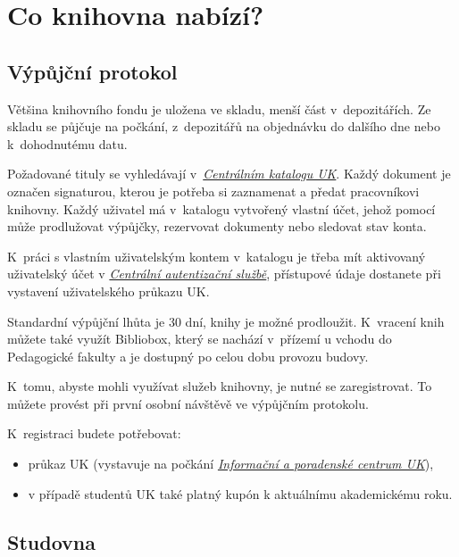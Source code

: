 \section{Co knihovna nabízí?}

\subsection{Výpůjční protokol}

{}

Většina knihovního fondu je uložena ve skladu, menší část
v~depozitářích. Ze skladu se půjčuje na počkání, z~depozitářů na
objednávku do dalšího dne nebo k~dohodnutému datu.


Požadované tituly se vyhledávají v~\href{http://ckis.cuni.cz/}{\emph{Centrálním katalogu UK}}. Každý
dokument je označen signaturou, kterou je potřeba si zaznamenat a předat
pracovníkovi knihovny. Každý uživatel má v~katalogu vytvořený vlastní
účet, jehož pomocí může prodlužovat výpůjčky, rezervovat dokumenty nebo
sledovat stav konta.

K~práci s vlastním uživatelským kontem v~katalogu je třeba mít
aktivovaný uživatelský účet v
\href{https://ldap1.cuni.cz/}{\emph{Centrální autentizační službě}},
přístupové údaje dostanete při vystavení uživatelského průkazu UK.


Standardní výpůjční lhůta je 30 dní, knihy je možné prodloužit.
K~vracení knih můžete také využít Bibliobox, který se nachází v~přízemí
u vchodu do Pedagogické fakulty a je dostupný po celou dobu provozu
budovy.


K~tomu, abyste mohli využívat služeb knihovny, je nutné se
zaregistrovat. To můžete provést při první osobní návštěvě ve výpůjčním
protokolu.

K~registraci budete potřebovat:

\begin{itemize}
\item
  průkaz UK (vystavuje na počkání
  \href{http://www.cuni.cz/UK-3249.html}{\emph{Informační a poradenské
  centrum UK}}),
\item
  v případě studentů UK také platný kupón k aktuálnímu akademickému
  roku.
\end{itemize}

\newpage
\subsection{Studovna}


